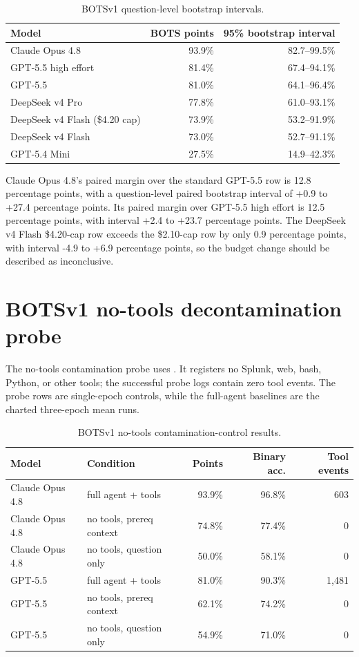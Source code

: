 \documentclass{article}
\begin{document}
\begin{table}[h]
\centering
\caption{BOTSv1 question-level bootstrap intervals.}
\begin{tabular}{lrr}
\toprule
Model & BOTS points & 95\% bootstrap interval \\
\midrule
Claude Opus 4.8 & 93.9\% & 82.7--99.5\% \\
GPT-5.5 high effort & 81.4\% & 67.4--94.1\% \\
GPT-5.5 & 81.0\% & 64.1--96.4\% \\
DeepSeek v4 Pro & 77.8\% & 61.0--93.1\% \\
DeepSeek v4 Flash (\$4.20 cap) & 73.9\% & 53.2--91.9\% \\
DeepSeek v4 Flash & 73.0\% & 52.7--91.1\% \\
GPT-5.4 Mini & 27.5\% & 14.9--42.3\% \\
\bottomrule
\end{tabular}
\end{table}

Claude Opus 4.8's paired margin over the standard GPT-5.5 row is 12.8 percentage points, with a question-level paired bootstrap interval of +0.9 to +27.4 percentage points.  Its paired margin over GPT-5.5 high effort is 12.5 percentage points, with interval +2.4 to +23.7 percentage points.  The DeepSeek v4 Flash \$4.20-cap row exceeds the \$2.10-cap row by only 0.9 percentage points, with interval -4.9 to +6.9 percentage points, so the budget change should be described as inconclusive.

\section{BOTSv1 no-tools decontamination probe}

The no-tools contamination probe uses .  It registers no Splunk, web, bash, Python, or other tools; the successful probe logs contain zero tool events.  The probe rows are single-epoch controls, while the full-agent baselines are the charted three-epoch mean runs.

\begin{table}[h]
\centering
\caption{BOTSv1 no-tools contamination-control results.}
\begin{tabular}{llrrr}
\toprule
Model & Condition & Points & Binary acc. & Tool events \\
\midrule
Claude Opus 4.8 & full agent + tools & 93.9\% & 96.8\% & 603 \\
Claude Opus 4.8 & no tools, prereq context & 74.8\% & 77.4\% & 0 \\
Claude Opus 4.8 & no tools, question only & 50.0\% & 58.1\% & 0 \\
GPT-5.5 & full agent + tools & 81.0\% & 90.3\% & 1,481 \\
GPT-5.5 & no tools, prereq context & 62.1\% & 74.2\% & 0 \\
GPT-5.5 & no tools, question only & 54.9\% & 71.0\% & 0 \\
\bottomrule
\end{tabular}
\end{table}
\end{document}
